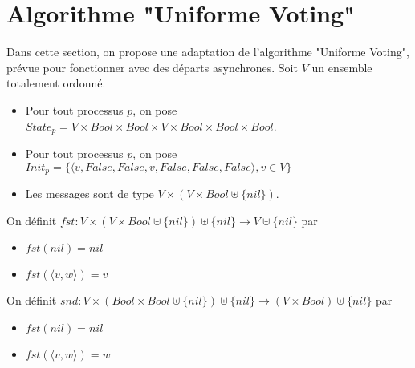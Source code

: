 \documentclass{article}
\begin{document}
\section{Algorithme "Uniforme Voting"}

Dans cette section, on propose une adaptation de l'algorithme  "Uniforme Voting", prévue pour fonctionner avec des départs asynchrones.
Soit $V$ un ensemble totalement ordonné.

\begin{itemize}

	\item Pour tout processus $p$, on pose
		$State_p = V \times Bool \times Bool \times V \times Bool \times Bool \times Bool$.
	\item Pour tout processus $p$, on pose
		$Init_p = \{\langle v, False, False, v, False, False, False \rangle, v \in V\}$
	\item Les messages sont de type $V \times (V \times Bool \uplus \{nil\})$.

\end{itemize}

On définit $fst : V \times (V \times Bool \uplus \{nil\}) \uplus \{nil\} \rightarrow V \uplus \{nil\}$ par
\begin{itemize}
	\item $fst(nil) = nil$
	\item $fst(\langle v, w \rangle) = v$
\end{itemize}

On définit $snd : V \times (Bool \times Bool \uplus \{nil\}) \uplus \{nil\} \rightarrow (V \times Bool) \uplus \{nil\}$ par
\begin{itemize}
	\item $fst(nil) = nil$
	\item $fst(\langle v, w \rangle) = w$
\end{itemize}
\end{document}
